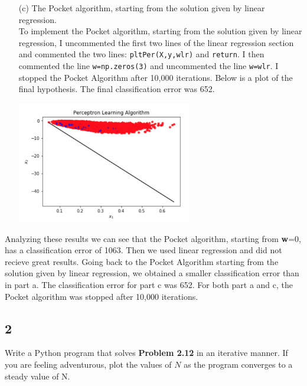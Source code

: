 \documentclass[a4paper]{article}
\begin{document}
\begin{itemize}
\begin{center}
    \end{center}
    \item[(c)] The Pocket algorithm, starting from the solution given by linear regression.\\
    To implement the Pocket algorithm, starting from the solution given by linear regression, I 
    uncommented the first two lines of the linear regression section and commented the two lines: 
    \verb|pltPer(X,y,wlr)| and \verb|return|.  I then commented the line \verb|w=np.zeros(3)| 
    and uncommented the line \verb|w=wlr|.  I stopped the Pocket Algorithm after 10,000 iterations.  
    Below is a plot of the final hypothesis.  The final classification error was 652.
    \begin{center}
        \includegraphics[width=0.6\textwidth]{c-Pocket.jpg}
    \end{center}
\end{itemize}

Analyzing these results we can see that the Pocket algorithm, starting from \textbf{w}=0, has a 
classification error of 1063.  Then we used linear regression and did not recieve great results.  
Going back to the Pocket Algorithm starting from the solution given by linear regression, we 
obtained a smaller classification error than in part a.  The classification error for part c 
was 652.  For both part a and c, the Pocket algorithm was stopped after 10,000 iterations.


\subsection{2} Write a Python program that solves \textbf{Problem 2.12} in an iterative manner.  
If you are feeling adventurous, plot the values of $N$ as the program converges to a steady 
value of N.\\
\end{document}
